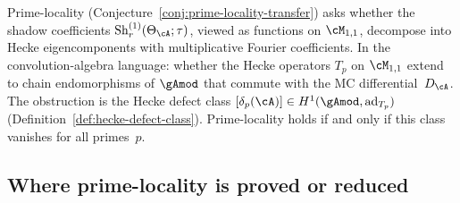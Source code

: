 Prime-locality
(Conjecture~\ref{conj:prime-locality-transfer})
asks whether the shadow coefficients
$\operatorname{Sh}_r^{(1)}(\Theta_\cA;\tau)$, viewed as
functions on $\cM_{1,1}$, decompose into Hecke
eigencomponents with multiplicative Fourier coefficients.
In the convolution-algebra language: whether the Hecke
operators $T_p$ on $\cM_{1,1}$ extend to chain endomorphisms
of $\gAmod$ that commute with the MC differential~$D_\cA$.
The obstruction is the Hecke defect class
$[\delta_p(\cA)] \in H^1(\gAmod, \mathrm{ad}_{T_p})$
(Definition~\ref{def:hecke-defect-class}).
Prime-locality holds if and only if this class vanishes
for all primes~$p$.

\subsection{Where prime-locality is proved or reduced}


